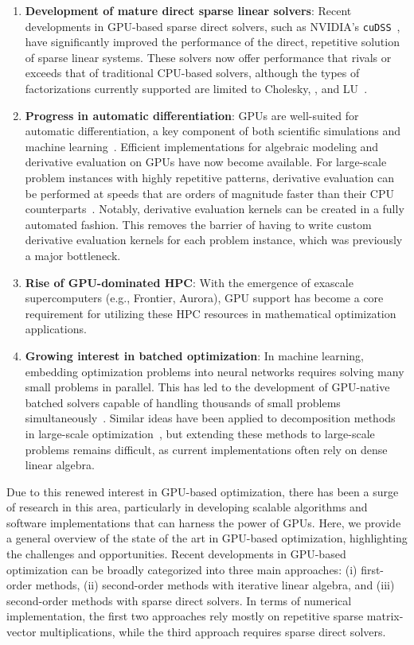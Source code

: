 \begin{enumerate}
\item \textbf{Development of mature direct sparse linear solvers}: Recent developments in GPU-based sparse direct solvers, such as NVIDIA's {\tt cuDSS}~\cite{nvidiaNVIDIACuDSSPreview}, have significantly improved the performance of the direct, repetitive solution of sparse linear systems. These solvers now offer performance that rivals or exceeds that of traditional CPU-based solvers, although the types of factorizations currently supported are limited to Cholesky, \ldlt, and LU~\cite{nvidiaNVIDIACuDSSPreview,shin2023accelerating}.
\item \textbf{Progress in automatic differentiation}: GPUs are well-suited for automatic differentiation, a key component of both scientific simulations and machine learning~\cite{jax2018github,enzyme2021}. Efficient implementations for algebraic modeling and derivative evaluation on GPUs have now become available. For large-scale problem instances with highly repetitive patterns, derivative evaluation can be performed at speeds that are orders of magnitude faster than their CPU counterparts~\cite{shin2023accelerating}. Notably, derivative evaluation kernels can be created in a fully automated fashion. This removes the barrier of having to write custom derivative evaluation kernels for each problem instance, which was previously a major bottleneck.
\item \textbf{Rise of GPU-dominated HPC}: With the emergence of exascale supercomputers (e.g., Frontier, Aurora), GPU support has become a core requirement for utilizing these HPC resources in mathematical optimization applications.
\item \textbf{Growing interest in batched optimization}:
  In machine learning, embedding optimization problems into neural networks requires solving many small problems in parallel. This has led to the development of GPU-native batched solvers capable of handling thousands of small problems simultaneously~\cite{amos2017optnet,pineda2022theseus}. Similar ideas have been applied to decomposition methods in large-scale optimization~\cite{kimLeveragingGPUBatching2021}, but extending these methods to large-scale problems remains difficult, as current implementations often rely on dense linear algebra.
\end{enumerate}


Due to this renewed interest in GPU-based optimization, there has been a surge of research in this area, particularly in developing scalable algorithms and software implementations that can harness the power of GPUs. Here, we provide a general overview of the state of the art in GPU-based optimization, highlighting the challenges and opportunities. Recent developments in GPU-based optimization can be broadly categorized into three main approaches: (i) first-order methods, (ii) second-order methods with iterative linear algebra, and (iii) second-order methods with sparse direct solvers. In terms of numerical implementation, the first two approaches rely mostly on repetitive sparse matrix-vector multiplications, while the third approach requires sparse direct solvers.

